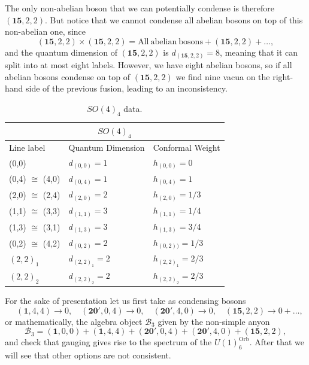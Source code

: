 \documentclass[11pt]{article}
\numberwithin{equation}{section}
\begin{document}
The only non-abelian boson that we can potentially condense is therefore $(\mathbf{15},2,2)$. But notice that we cannot condense all abelian bosons on top of this non-abelian one, since 
\begin{equation}
    (\mathbf{15},2,2) \times (\mathbf{15},2,2) = \mathrm{All \ abelian \ bosons} + (\mathbf{15},2,2) + \ldots,
\end{equation}
and the quantum dimension of $(\mathbf{15},2,2)$ is $d_{(\mathbf{15},2,2)} = 8$, meaning that it can split into at most eight labels. However, we have eight abelian bosons, so if all abelian bosons condense on top of $(\mathbf{15},2,2)$ we find nine vacua on the right-hand side of the previous fusion, leading to an inconsistency.


\begin{table}[!b]
\centering
\begin{tabular}[h]{|p{4cm}|p{4cm}|p{4cm}| }
\hline 
\multicolumn{3}{|c|}{$SO(4)_{4}$} \\
\hline
Line label & Quantum Dimension & Conformal Weight \\
\hline
(0,0) & $d_{(0,0)}=1$ & $h_{(0,0)}=0$ \\
(0,4) $\cong$ (4,0) & $d_{(0,4)}=1$ & $h_{(0,4)}=1$ \\
(2,0) $\cong$ (2,4) & $d_{(2,0)}=2$ & $h_{(2,0)}=1/3$ \\
(1,1) $\cong$ (3,3) & $d_{(1,1)}=3$ & $h_{(1,1)}=1/4$ \\
(1,3) $\cong$ (3,1) & $d_{(1,3)}=3$ & $h_{(1,3)}=3/4$ \\
(0,2) $\cong$ (4,2) & $d_{(0,2)}=2$ & $h_{(0,2))}=1/3$ \\
$(2,2)_{1}$ & $d_{(2,2)_{1}}=2$ & $h_{(2,2)_{1}}=2/3$ \\
$(2,2)_{2}$ & $d_{(2,2)_{2}}=2$ & $h_{(2,2)_{2}}=2/3$ \\
\hline
\end{tabular}
\caption{$SO(4)_{4}$ data.}  \label{so4lv4table}
\end{table}



For the sake of presentation let us first take as condensing bosons
\begin{equation} \label{condensingbosonsorbifold}
    \quad (\mathbf{1},4,4) \to 0, \quad (\mathbf{20}',0,4) \to 0, \quad (\mathbf{20}',4,0) \to 0, \quad (\mathbf{15},2,2) \to 0 + \ldots,
\end{equation}
or mathematically, the algebra object $\mathcal{B}_{3}$ given by the non-simple anyon
\begin{equation}
    \mathcal{B}_{3} = (\mathbf{1},0,0) + (\mathbf{1},4,4) + (\mathbf{20}',0,4) + (\mathbf{20}',4,0) + (\mathbf{15},2,2),
\end{equation}
and check that gauging gives rise to the spectrum of the $U(1)^{\mathrm{Orb}}_{6}$. After that we will see that other options are not consistent. 
\end{document}

